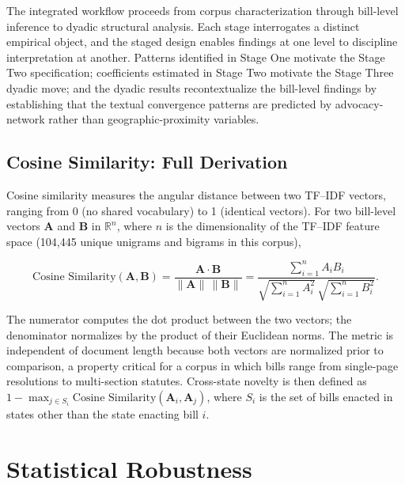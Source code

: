 \documentclass[12pt]{report}
\begin{document}
The integrated workflow proceeds from corpus characterization through bill-level
inference to dyadic structural analysis. Each stage interrogates a distinct empirical
object, and the staged design enables findings at one level to discipline interpretation
at another. Patterns identified in Stage One motivate the Stage Two specification;
coefficients estimated in Stage Two motivate the Stage Three dyadic move; and the dyadic
results recontextualize the bill-level findings by establishing that the textual
convergence patterns are predicted by advocacy-network rather than geographic-proximity
variables.

\section{Cosine Similarity: Full Derivation}
\label{app:B.3}

Cosine similarity measures the angular distance between two TF--IDF vectors, ranging
from 0 (no shared vocabulary) to 1 (identical vectors). For two bill-level vectors
$\mathbf{A}$ and $\mathbf{B}$ in $\mathbb{R}^{n}$, where $n$ is the dimensionality of
the TF--IDF feature space (104,445 unique unigrams and bigrams in this corpus),

\begin{equation}
\text{Cosine Similarity}(\mathbf{A}, \mathbf{B})
   = \frac{\mathbf{A} \cdot \mathbf{B}}{\|\mathbf{A}\|\,\|\mathbf{B}\|}
   = \frac{\sum_{i=1}^{n} A_i B_i}
          {\sqrt{\sum_{i=1}^{n} A_i^{2}}\,\sqrt{\sum_{i=1}^{n} B_i^{2}}}.
\end{equation}

The numerator computes the dot product between the two vectors; the denominator
normalizes by the product of their Euclidean norms. The metric is independent of
document length because both vectors are normalized prior to comparison, a property
critical for a corpus in which bills range from single-page resolutions to
multi-section statutes. Cross-state novelty is then defined as
$1 - \max_{j \in S_i} \text{Cosine Similarity}(\mathbf{A}_i, \mathbf{A}_j)$, where
$S_i$ is the set of bills enacted in states other than the state enacting bill $i$.

\chapter{Statistical Robustness}
\label{app:C}
\end{document}
